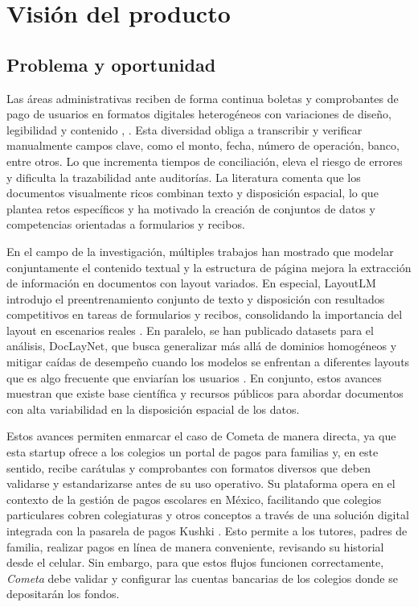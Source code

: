 \chapter{Visión del producto}

\section{Problema y oportunidad}

Las áreas administrativas reciben de forma continua boletas y comprobantes de pago de usuarios en formatos digitales heterogéneos con variaciones de diseño, legibilidad y contenido \cite{Zheng2023DocLevelIE} , \cite{Huang2021SROIE}. Esta diversidad obliga a transcribir y verificar manualmente campos clave, como el monto, fecha, número de operación, banco, entre otros. Lo que incrementa tiempos de conciliación, eleva el riesgo de errores y dificulta la trazabilidad ante auditorías\cite{Huang2021SROIE}. La literatura comenta que los documentos visualmente ricos combinan texto y disposición espacial, lo que plantea retos específicos y ha motivado la creación de conjuntos de datos y competencias orientadas a formularios y recibos.\cite{Cui2021}

En el campo de la investigación, múltiples trabajos han mostrado que modelar conjuntamente el contenido textual y la estructura de página mejora la extracción de información en documentos con layout variados. En especial, LayoutLM introdujo el preentrenamiento conjunto de texto y disposición con resultados competitivos en tareas de formularios y recibos, consolidando la importancia del layout en escenarios reales \cite{Xu2020LayoutLM}. En paralelo, se han publicado datasets para el análisis, DocLayNet, que busca generalizar más allá de dominios homogéneos y mitigar caídas de desempeño cuando los modelos se enfrentan a diferentes layouts que es algo frecuente que enviarían los usuarios \cite{Pfitzmann2022DocLayNet}. En conjunto, estos avances muestran que existe base científica y recursos públicos para abordar documentos con alta variabilidad en la disposición espacial de los datos.


Estos avances permiten enmarcar el caso de Cometa de manera directa, ya que esta startup ofrece a los colegios un portal de pagos para familias y, en este sentido, recibe carátulas y comprobantes con formatos diversos que deben validarse y estandarizarse antes de su uso operativo. Su plataforma opera en el contexto de la gestión de pagos escolares en México, facilitando que colegios particulares cobren colegiaturas y otros conceptos a través de una solución digital integrada con la pasarela de pagos Kushki \cite{cometa_onboarding}. Esto permite a los tutores, padres de familia, realizar pagos en línea de manera conveniente, revisando su historial desde el celular. Sin embargo, para que estos flujos funcionen correctamente, \textit{Cometa} debe validar y configurar las cuentas bancarias de los colegios donde se depositarán los fondos.


